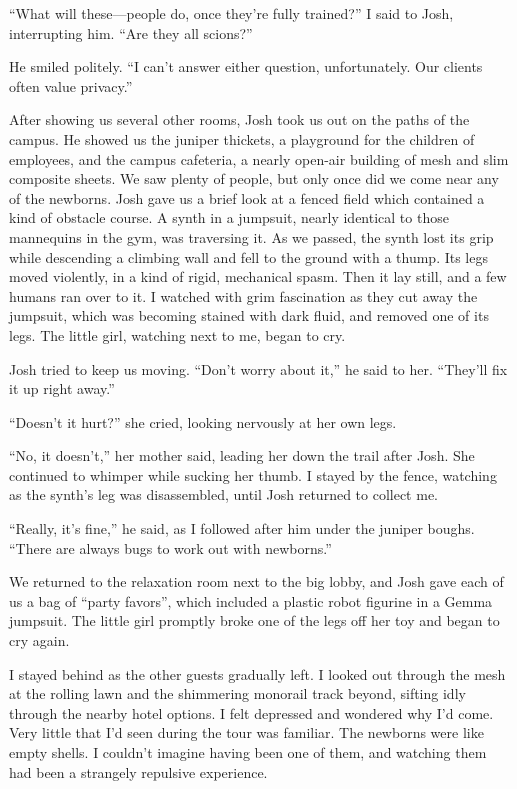 \documentclass[10pt,b5paper]{article}
\begin{document}
``What will these---people do, once they're fully trained?'' I said
to Josh, interrupting him. ``Are they all scions?''

He smiled politely. ``I can't answer either question, unfortunately.
Our clients often value privacy.''

After showing us several other rooms, Josh took us out on the paths
of the campus. He showed us the juniper thickets, a playground
for the children of employees, and the campus cafeteria, a nearly
open-air building of mesh and slim composite sheets. We saw plenty
of people, but only once did we come near any of the newborns. Josh
gave us a brief look at a fenced field which contained a kind of
obstacle course. A synth in a jumpsuit, nearly identical to those
mannequins in the gym, was traversing it. As we passed, the synth
lost its grip while descending a climbing wall and fell to the
ground with a thump. Its legs moved violently, in a kind of rigid,
mechanical spasm. Then it lay still, and a few humans ran over to it.
I watched with grim fascination as they cut away the jumpsuit, which
was becoming stained with dark fluid, and removed one of its legs.
The little girl, watching next to me, began to cry.

Josh tried to keep us moving. ``Don't worry about it,'' he said to her.
``They'll fix it up right away.''

``Doesn't it hurt?'' she cried, looking nervously at her own legs.

``No, it doesn't,'' her mother said, leading her down the trail after
Josh. She continued to whimper while sucking her thumb. I stayed by
the fence, watching as the synth's leg was disassembled, until Josh
returned to collect me.

``Really, it's fine,'' he said, as I followed after him under the
juniper boughs.  ``There are always bugs to work out with newborns.''

We returned to the relaxation room next to the big lobby, and Josh
gave each of us a bag of ``party favors'', which included a plastic
robot figurine in a Gemma jumpsuit. The little girl promptly broke
one of the legs off her toy and began to cry again.

I stayed behind as the other guests gradually left.  I looked out
through the mesh at the rolling lawn and the shimmering monorail
track beyond, sifting idly through the nearby hotel options.  I felt
depressed and wondered why I'd come.  Very little that I'd seen
during the tour was familiar.  The newborns were like empty shells. I
couldn't imagine having been one of them, and watching them had been
a strangely repulsive experience.
\end{document}
